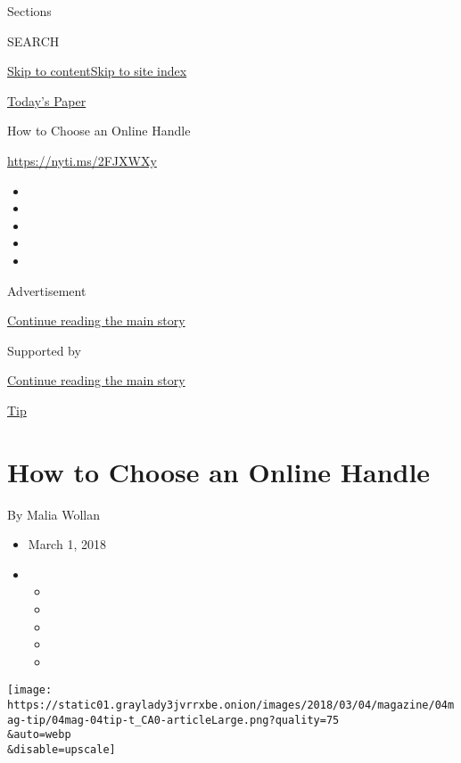 Sections

SEARCH

\protect\hyperlink{site-content}{Skip to
content}\protect\hyperlink{site-index}{Skip to site index}

\href{https://myaccount.nytimes3xbfgragh.onion/auth/login?response_type=cookie\&client_id=vi}{}

\href{https://www.nytimes3xbfgragh.onion/section/todayspaper}{Today's
Paper}

How to Choose an Online Handle

\url{https://nyti.ms/2FJXWXy}

\begin{itemize}
\item
\item
\item
\item
\item
\end{itemize}

Advertisement

\protect\hyperlink{after-top}{Continue reading the main story}

Supported by

\protect\hyperlink{after-sponsor}{Continue reading the main story}

\href{/column/magazine-tip}{Tip}

\hypertarget{how-to-choose-an-online-handle}{%
\section{How to Choose an Online
Handle}\label{how-to-choose-an-online-handle}}

By Malia Wollan

\begin{itemize}
\item
  March 1, 2018
\item
  \begin{itemize}
  \item
  \item
  \item
  \item
  \item
  \end{itemize}
\end{itemize}

\texttt{[image: https://static01.graylady3jvrrxbe.onion/images/2018/03/04/magazine/04mag-tip/04mag-04tip-t\_CA0-articleLarge.png?quality=75\\\&auto=webp\\\&disable=upscale]}

